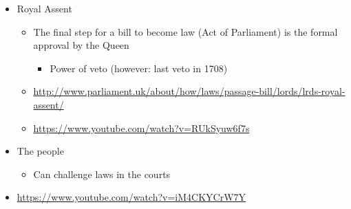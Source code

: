 \documentclass{article}
\begin{document}
\begin{itemize}
\item Royal Assent
\begin{itemize}
\item The final step for a bill to become law (Act of Parliament) is the formal approval by the Queen
\begin{itemize}
\item Power of veto (however: last veto in 1708)
\end{itemize}
\item \url{http://www.parliament.uk/about/how/laws/passage-bill/lords/lrds-royal-assent/}
\item \url{https://www.youtube.com/watch?v=RUkSyuw6f7s}
\end{itemize}
\item The people
\begin{itemize}
\item Can challenge laws in the courts
\end{itemize}

\item \url{https://www.youtube.com/watch?v=iM4CKYCrW7Y}
\end{itemize}




\end{document}
